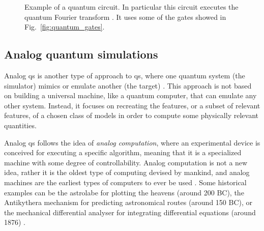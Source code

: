\begin{figure}[t]
    \centering
    \scalebox{0.75}{}
    \caption[Example of a quantum circuit]{
        Example of a quantum circuit.
        In particular this circuit executes the quantum Fourier transform \cite{nielsen2010quantum}.
        It uses some of the gates showed in Fig.~\ref{fig:quantum_gates}.
    }
    \label{fig:quantum_fourier}
\end{figure}


%
%
\subsection{Analog quantum simulations}
\label{sub:analog_quantum_simulations}

Analog \ac{qs} is another type of approach to \ac{qs}, where one quantum system (the simulator) mimics or emulate another (the target) \cite{buluta2009simulators, wei1997simulation, arguello2019simulation, aspuruguzik2012photonic, blatt2012trappedions, bloch2012ultracold, houck2012superconducting, lewenstein2012ultracold}.
This approach is not based on building a universal machine, like a quantum computer, that can emulate any other system.
Instead, it focuses on recreating the features, or a subset of relevant features, of a chosen class of models in order to compute some physically relevant quantities.

Analog \ac{qs} follows the idea of \emph{analog computation}, where an experimental device is conceived for executing a specific algorithm, meaning that it is a specialized machine with some degree of controllability.
Analog computation is not a new idea, rather it is the oldest type of computing devised by mankind, and analog machines are the earliest types of computers to ever be used \cite{kendon2010quantum}.
Some historical examples can be the astrolabe for plotting the heavens (around 200 BC), the Antikythera mechanism for predicting astronomical routes (around 150 BC), or the mechanical differential analyser for integrating differential equations (around 1876) \cite{thomson1876integration}.

